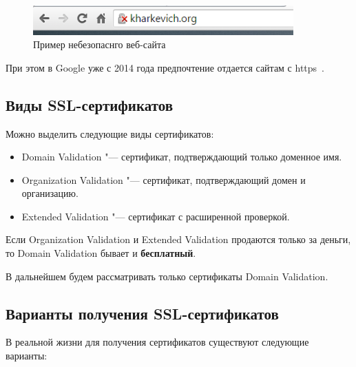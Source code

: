 \documentclass[10pt, a5paper]{article}
\begin{document}
\begin{figure}[h!]
  \centering
  \includegraphics[width=10cm]{w_03_2016_Kharkevich3.png}
\caption*{Пример небезопаснго веб-сайта}\label{fig:Kharkevich3}
\end{figure}


При этом в Google уже с 2014 года предпочтение отдается сайтам с https~\cite{Kharkevich3}.

\subsection*{Виды SSL-сертификатов}

Можно выделить следующие виды сертификатов:

\begin{itemize}
  \item Domain Validation "--- сертификат, подтверждающий только доменное имя.
  \item Organization Validation "--- сертификат, подтверждающий домен и организацию.
  \item Extended Validation "--- сертификат с расширенной проверкой.
\end{itemize}

Если Organization Validation и Extended Validation продаются только за деньги, то Domain Validation бывает и \textbf{бесплатный}.

В дальнейшем будем рассматривать только сертификаты Domain Validation.

\subsection*{Варианты получения SSL-сертификатов}

В реальной жизни для получения сертификатов существуют следующие варианты:
\end{document}

